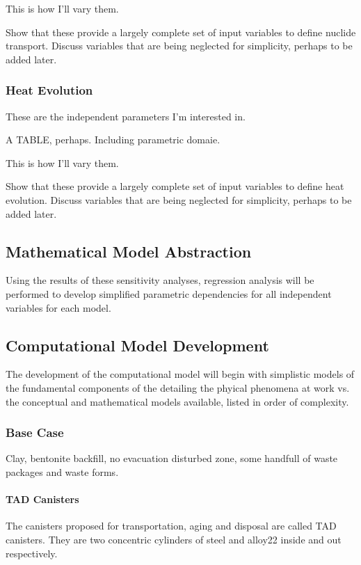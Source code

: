 This is how I'll vary them.

Show that these provide a largely complete set of input variables to define 
nuclide transport. Discuss variables that are being neglected for simplicity, 
perhaps to be added later. 

\subsubsection{Heat Evolution}

These are the independent parameters I'm interested in.

A TABLE, perhaps. Including parametric domaie.

This is how I'll vary them.

Show that these provide a largely complete set of input variables to define heat 
evolution. Discuss variables that are being neglected for simplicity, perhaps to 
be added later. 

\subsection{Mathematical Model Abstraction}

Using the results of these sensitivity analyses, regression analysis will be 
performed to develop simplified parametric dependencies for all independent 
variables for each model. 

\subsection{Computational Model Development}

The development of the computational model will begin with simplistic models of  
the fundamental components of the detailing the phyical phenomena at work vs.  
the conceptual and mathematical models available, listed in order of complexity.


\subsubsection{Base Case}

Clay, bentonite backfill, no evacuation disturbed zone, some handfull of waste 
packages and waste forms.




\paragraph{TAD Canisters} The canisters proposed for transportation, aging and 
disposal are called TAD canisters.  They are two concentric cylinders of steel 
and alloy22 inside and out respectively. 


